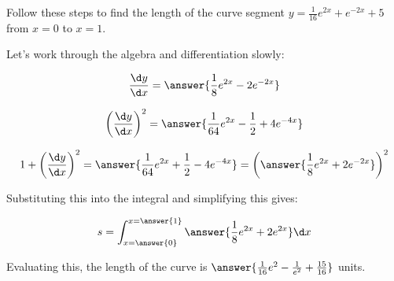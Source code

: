 \documentclass{ximera}
\author{Jim Talamo}
\begin{document}
\begin{exercise}

Follow these steps to find the length of the curve segment $y=\frac{1}{16}e^{2x}+e^{-2x}+5$ from $x=0$ to $x=1$.

Let's work through the algebra and differentiation slowly:

\[
\frac{\d y}{\d x} = \answer{\frac{1}{8}e^{2x}-2e^{-2x}}
\]
\begin{exercise}
\[
\left(\frac{\d y}{\d x}\right)^2 = \answer{\frac{1}{64}e^{2x}-\frac{1}{2}+4e^{-4x}}
\]

\begin{exercise}

\[
1+ \left(\frac{\d y}{\d x}\right)^2 = \answer{\frac{1}{64}e^{2x}+\frac{1}{2}-4e^{-4x}} = \left(\answer{\frac{1}{8}e^{2x}+2e^{-2x} }  \right)^2
\]

\begin{exercise}
Substituting this into the integral and simplifying this gives:

\[
s= \int_{x=\answer{0}}^{x=\answer{1}} \answer{\frac{1}{8}e^{2x}+2e^{2x}} \d x 
\]

Evaluating this, the length of the curve is $\answer{\frac{1}{16}e^2-\frac{1}{e^2} +\frac{15}{16} }$ units.

\end{exercise}
\end{exercise}
\end{exercise}



\end{exercise}
\end{document}
